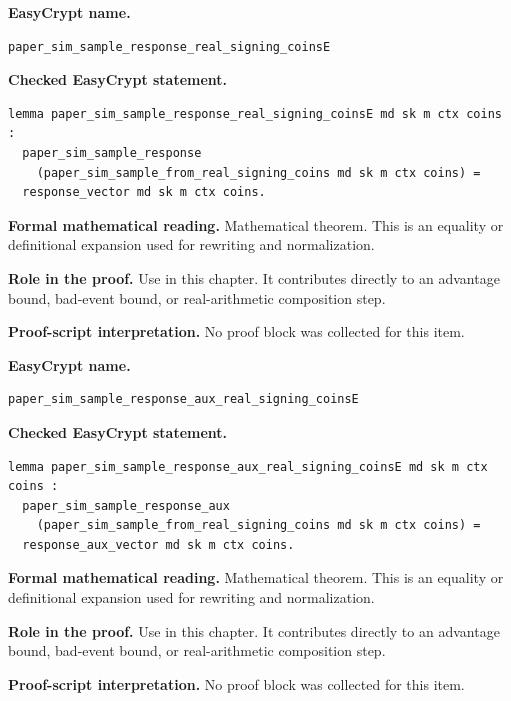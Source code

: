 \begin{formaltheorem}
\noindent\textbf{EasyCrypt name.}
\begin{lstlisting}[language=EasyCrypt,basicstyle=\ttfamily\scriptsize]
paper_sim_sample_response_real_signing_coinsE
\end{lstlisting}
\noindent\textbf{Checked EasyCrypt statement.}
\begin{lstlisting}[language=EasyCrypt,basicstyle=\ttfamily\scriptsize]
lemma paper_sim_sample_response_real_signing_coinsE md sk m ctx coins :
  paper_sim_sample_response
    (paper_sim_sample_from_real_signing_coins md sk m ctx coins) =
  response_vector md sk m ctx coins.
\end{lstlisting}
\noindent\textbf{Formal mathematical reading.}
Mathematical theorem. This is an equality or definitional expansion used for rewriting and normalization.

\noindent\textbf{Role in the proof.}
Use in this chapter. It contributes directly to an advantage bound, bad-event bound, or real-arithmetic composition step.

\noindent\textbf{Proof-script interpretation.}
No proof block was collected for this item.

\end{formaltheorem}

\begin{formaltheorem}
\noindent\textbf{EasyCrypt name.}
\begin{lstlisting}[language=EasyCrypt,basicstyle=\ttfamily\scriptsize]
paper_sim_sample_response_aux_real_signing_coinsE
\end{lstlisting}
\noindent\textbf{Checked EasyCrypt statement.}
\begin{lstlisting}[language=EasyCrypt,basicstyle=\ttfamily\scriptsize]
lemma paper_sim_sample_response_aux_real_signing_coinsE md sk m ctx coins :
  paper_sim_sample_response_aux
    (paper_sim_sample_from_real_signing_coins md sk m ctx coins) =
  response_aux_vector md sk m ctx coins.
\end{lstlisting}
\noindent\textbf{Formal mathematical reading.}
Mathematical theorem. This is an equality or definitional expansion used for rewriting and normalization.

\noindent\textbf{Role in the proof.}
Use in this chapter. It contributes directly to an advantage bound, bad-event bound, or real-arithmetic composition step.

\noindent\textbf{Proof-script interpretation.}
No proof block was collected for this item.

\end{formaltheorem}

